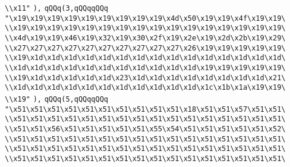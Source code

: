 \verb|\\x11"|\newline
\verb|),|\newline
\verb|qQQq(3,qQQqqQQq|\newline
\verb|"\x19\x19\x19\x19\x19\x19\x19\x19\x19\x4d\x50\x19\x19\x4f\x19\x19\|\newline
\verb|\\x19\x19\x19\x19\x19\x19\x19\x19\x19\x19\x19\x19\x19\x19\x19\x19\|\newline
\verb|\\x4d\x19\x19\x46\x19\x32\x19\x30\x2f\x19\x2e\x19\x2d\x2b\x19\x29\|\newline
\verb|\\x27\x27\x27\x27\x27\x27\x27\x27\x27\x27\x26\x19\x19\x19\x19\x19\|\newline
\verb|\\x19\x1d\x1d\x1d\x1d\x1d\x1d\x1d\x1d\x1d\x1d\x1d\x1d\x1d\x1d\x1d\|\newline
\verb|\\x1d\x1d\x1d\x1d\x1d\x1d\x1d\x1d\x1d\x1d\x1d\x19\x19\x19\x19\x19\|\newline
\verb|\\x19\x1d\x1d\x1d\x1d\x1d\x23\x1d\x1d\x1d\x1d\x1d\x1d\x1d\x1d\x21\|\newline
\verb|\\x1d\x1d\x1d\x1d\x1d\x1d\x1d\x1d\x1d\x1d\x1d\x1c\x1b\x1a\x19\x19\|\newline
\verb|\\x19"|\newline
\verb|),|\newline
\verb|qQQq(5,qQQqqQQq|\newline
\verb|"\x51\x51\x51\x51\x51\x51\x51\x51\x51\x51\x18\x51\x51\x57\x51\x51\|\newline
\verb|\\x51\x51\x51\x51\x51\x51\x51\x51\x51\x51\x51\x51\x51\x51\x51\x51\|\newline
\verb|\\x51\x51\x56\x51\x51\x51\x51\x51\x55\x54\x51\x51\x51\x51\x51\x52\|\newline
\verb|\\x51\x51\x51\x51\x51\x51\x51\x51\x51\x51\x51\x51\x51\x51\x51\x51\|\newline
\verb|\\x51\x51\x51\x51\x51\x51\x51\x51\x51\x51\x51\x51\x51\x51\x51\x51\|\newline
\verb|\\x51\x51\x51\x51\x51\x51\x51\x51\x51\x51\x51\x51\x51\x51\x51\x51\|\newline

